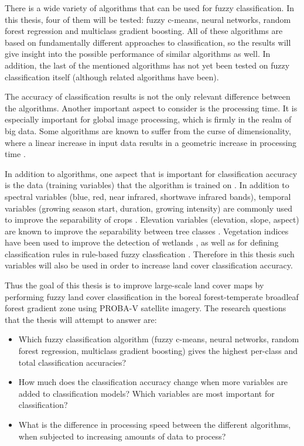 \documentclass[a4paper,10pt]{article}
\begin{document}
There is a wide variety of algorithms that can be used for fuzzy classification. In this thesis, four of them will be tested: fuzzy c-means, neural networks, random forest regression and multiclass gradient boosting. All of these algorithms are based on fundamentally different approaches to classification, so the results will give insight into the possible performance of similar algorithms as well. In addition, the last of the mentioned algorithms has not yet been tested on fuzzy classification itself (although related algorithms have been).

The accuracy of classification results is not the only relevant difference between the algorithms. Another important aspect to consider is the processing time. It is especially important for global image processing, which is firmly in the realm of big data. Some algorithms are known to suffer from the curse of dimensionality, where a linear increase in input data results in a geometric increase in processing time \citep{walton2008subpixelrf}.

In addition to algorithms, one aspect that is important for classification accuracy is the data (training variables) that the algorithm is trained on \citep{yu2014metadiscoveries}. In addition to spectral variables (blue, red, near infrared, shortwave infrared bands), temporal variables (growing season start, duration, growing intensity) are commonly used to improve the separability of crops \citep{jakubauskas2001harmonic}. Elevation variables (elevation, slope, aspect) are known to improve the separability between tree classes \citep{burrough2001fuzzy}. Vegetation indices have been used to improve the detection of wetlands \citep{sader1995wetlands}, as well as for defining classification rules in rule-based fuzzy classfication \citep{baraldi2006rulebased}. Therefore in this thesis such variables will also be used in order to increase land cover classification accuracy.

Thus the goal of this thesis is to improve large-scale land cover maps by performing fuzzy land cover classification in the boreal forest-temperate broadleaf forest gradient zone using PROBA-V satellite imagery. The research questions that the thesis will attempt to answer are:

\begin{itemize}
 \item Which fuzzy classification algorithm (fuzzy c-means, neural networks, random forest regression, multiclass gradient boosting) gives the highest per-class and total classification accuracies?
 \item How much does the classification accuracy change when more variables are added to classification models? Which variables are most important for classification?
 \item What is the difference in processing speed between the different algorithms, when subjected to increasing amounts of data to process?
\end{itemize}
\end{document}
